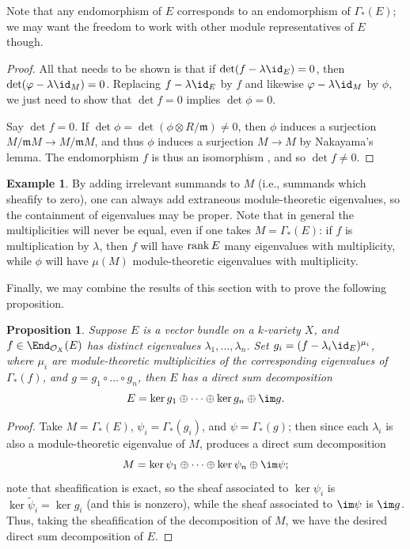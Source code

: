 \documentclass[12pt]{amsart}
\let\wtilde\widetilde
\def\OO{\mathcal O}
\def\m{\mathfrak m}
\theoremstyle{theorem}
\numberwithin{thm}{section}
\newtheorem{prop}[thm]{Proposition}
\theoremstyle{definition}
\newtheorem{exa}[thm]{Example}
\begin{document}
Note that any endomorphism of $E$ corresponds to an endomorphism of $\Gamma_*(E)$; we may want the freedom to work with other module representatives of $E$ though.

\begin{proof}
  All that needs to be shown is that if $\det(f-\lambda \id_E) =0$, then $\det(\phi-\lambda \id_M)=0$. Replacing $f-\lambda \id_E$ by $f$ and likewise $\phi-\lambda\id_M$ by $\phi$,
  we just need to show that $\det f = 0$ implies $\det\phi = 0$.

  Say $\det f = 0$. If $\det\phi = \det(\phi\otimes R/\m)\neq 0$, then $\phi$ induces a surjection $M/\m M\to M/\m M$, and thus $\phi$ induces a surjection $M\to M$ by Nakayama's lemma. The endomorphism $f$ is thus an isomorphism \cite[Corollary~4.4]{Eisenbud95}, and so $\det f\neq 0$.
\end{proof}

\begin{exa}
  By adding irrelevant summands to $M$ (i.e., summands which sheafify to zero), one can always add extraneous module-theoretic eigenvalues, so the containment of eigenvalues may be proper.
  Note that in general the multiplicities will never be equal, even if one takes $M=\Gamma_*(E)$: if $f$ is multiplication by $\lambda$, then $f$ will have $\operatorname{rank} E$ many eigenvalues with multiplicity, while $\phi$ will have $\mu(M)$ module-theoretic eigenvalues with multiplicity.
\end{exa}

Finally, we may combine the results of this section with  to prove the following proposition.

\begin{prop}
  Suppose $E$ is a vector bundle on a $k$-variety $X$, and $f\in\End_{\OO_X}(E)$ has distinct eigenvalues $\lambda_1,\dots,\lambda_n$. Set $g_i = (f - \lambda_i\id_E)^{\mu_i}$, where $\mu_i$ are module-theoretic multiplicities of the corresponding eigenvalues of $\Gamma_*(f)$, and $g = g_1\circ\dots\circ g_n$, then $E$ has a direct sum decomposition
  \[ E = \ker g_1 \oplus \dots \oplus \ker g_n \oplus \im g. \]
\end{prop}
\begin{proof}
  Take $M = \Gamma_*(E)$, $\psi_i = \Gamma_*(g_i)$, and $\psi = \Gamma_*(g)$; then since each $\lambda_i$ is also a module-theoretic eigenvalue of $M$,  produces a direct sum decomposition
  \[ M = \ker\psi_1 \oplus \cdots \oplus \ker\psi_n \oplus \im\psi; \]
note that sheafification is exact, so the sheaf associated to $\ker \psi_i$ is $\ker \wtilde \psi_i = \ker g_i$ (and this is nonzero), while the sheaf associated to $\im \psi $ is $\im g$.
Thus, taking the sheafification of the decomposition of $M$,
we have the desired direct sum decomposition of $E$.
\end{proof}
\end{document}
